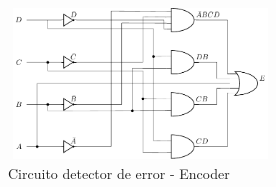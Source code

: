 \begin{figure}[H]
\centering
\includegraphics[width=7cm,height=4cm]{Ejercicio_3/Circuitos/Circuito_ENCODER_ERROR.pdf}
\caption{Circuito detector de error - Encoder}
\label{fig:Circuito_ENCODER_ERROR}
\end{figure}
